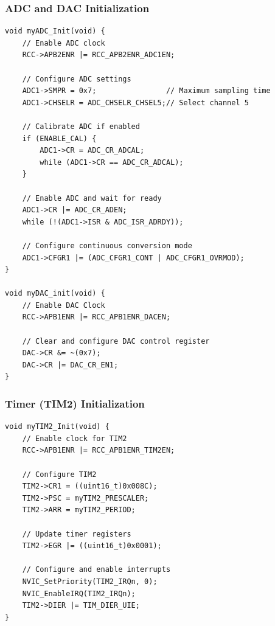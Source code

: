 \subsubsection{ADC and DAC Initialization}
\begin{lstlisting}[caption=ADC and DAC Initialization Function \cite{interfacex}]
void myADC_Init(void) {
    // Enable ADC clock
    RCC->APB2ENR |= RCC_APB2ENR_ADC1EN;
    
    // Configure ADC settings
    ADC1->SMPR = 0x7;                // Maximum sampling time
    ADC1->CHSELR = ADC_CHSELR_CHSEL5;// Select channel 5
    
    // Calibrate ADC if enabled
    if (ENABLE_CAL) {
        ADC1->CR = ADC_CR_ADCAL;
        while (ADC1->CR == ADC_CR_ADCAL);
    }
    
    // Enable ADC and wait for ready
    ADC1->CR |= ADC_CR_ADEN;
    while (!(ADC1->ISR & ADC_ISR_ADRDY));
    
    // Configure continuous conversion mode
    ADC1->CFGR1 |= (ADC_CFGR1_CONT | ADC_CFGR1_OVRMOD);
}

void myDAC_init(void) {
    // Enable DAC Clock
    RCC->APB1ENR |= RCC_APB1ENR_DACEN;
    
    // Clear and configure DAC control register
    DAC->CR &= ~(0x7);
    DAC->CR |= DAC_CR_EN1;
}
\end{lstlisting}

\subsubsection{Timer (TIM2) Initialization}
\begin{lstlisting}[caption=Timer 2 Initialization Function \cite{iox}]
void myTIM2_Init(void) {
    // Enable clock for TIM2
    RCC->APB1ENR |= RCC_APB1ENR_TIM2EN;
    
    // Configure TIM2
    TIM2->CR1 = ((uint16_t)0x008C);
    TIM2->PSC = myTIM2_PRESCALER;
    TIM2->ARR = myTIM2_PERIOD;
    
    // Update timer registers
    TIM2->EGR |= ((uint16_t)0x0001);
    
    // Configure and enable interrupts
    NVIC_SetPriority(TIM2_IRQn, 0);
    NVIC_EnableIRQ(TIM2_IRQn);
    TIM2->DIER |= TIM_DIER_UIE;
}
\end{lstlisting}

